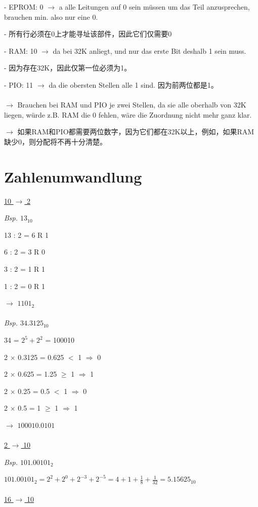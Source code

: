 \documentclass[fleqn]{article}
\begin{document}
- EPROM: 0 $\rightarrow$ a alle Leitungen auf 0 sein müssen um das Teil anzusprechen, brauchen min. also nur eine 0.

- 所有行必须在0上才能寻址该部件，因此它们仅需要0

- RAM: 10 $\rightarrow$ da bei 32K anliegt, und nur das erste Bit deshalb 1 sein muss.

- 因为存在32K，因此仅第一位必须为1。

- PIO: 11 $\rightarrow$ da die obersten Stellen alle 1 sind. 因为前两位都是1。
\\
\\
\indent$\rightarrow$ Brauchen bei RAM und PIO je zwei Stellen, da sie alle oberhalb von 32K liegen, würde z.B. RAM die 0 fehlen, wäre die Zuordnung nicht mehr ganz klar.

$\rightarrow$ 如果RAM和PIO都需要两位数字，因为它们都在32K以上，例如，如果RAM缺少0，则分配将不再十分清楚。

\section{Zahlenumwandlung}

\noindent\underline{10 $\rightarrow$ 2}

\noindent\textit{Bsp. $13_{10}$}

13 : 2 = 6 R 1

6 : 2 = 3 R 0

3 : 2 = 1 R 1

1 : 2 = 0 R 1

$\rightarrow$ $1101_2$
\\
\\
\noindent\textit{Bsp. $34.3125_{10}$}

34 = $2^5+2^2$ = 100010

2 $\times$ 0.3125 = 0.625 $<$ 1 $\Rightarrow$ 0

2 $\times$ 0.625 = 1.25 $\geq$ 1 $\Rightarrow$ 1

2 $\times$ 0.25 = 0.5 $<$ 1 $\Rightarrow$ 0

2 $\times$ 0.5 = 1 $\geq$ 1 $\Rightarrow$ 1

$\rightarrow$ $100010.0101$
\\
\\
\noindent\underline{2 $\rightarrow$ 10}

\noindent\textit{Bsp. $101.00101_{2}$}

$101.00101_2 = 2^2 + 2^0 + 2^{-3} + 2^{-5}=4+1+\frac{1}{8} + \frac{1}{32}=5.15625_{10}$
\\
\\
\noindent\underline{16 $\rightarrow$ 10}
\end{document}
